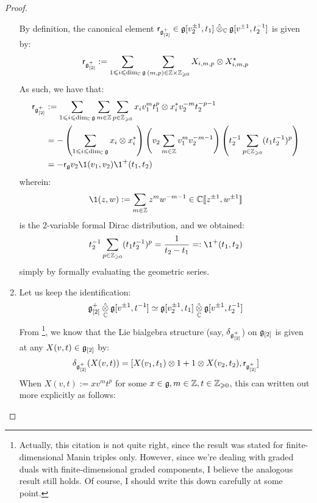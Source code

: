 \begin{proof}
\begin{enumerate}
                    By definition, the canonical element $\sfr_{\g_{[2]}^+} \in \g[v_2^{\pm 1}, t_1] \hattensor_{\bbC} \g[v^{\pm 1}, t_2^{-1}]$ is given by:
                        $$\sfr_{\g_{[2]}^+} := \sum_{1 \leq i \leq \dim_{\bbC} \g} \sum_{(m, p) \in \Z \x \Z_{\geq 0}} X_{i, m, p} \tensor X_{i, m, p}^{\star}$$
                    As such, we have that:
                        $$
                            \begin{aligned}
                                \sfr_{\g_{[2]}^+} & := \sum_{1 \leq i \leq \dim_{\bbC} \g} \sum_{m \in \Z} \sum_{p \in \Z_{\geq 0}} x_i v_1^m t_1^p \tensor x_i^* v_2^{-m} t_2^{-p - 1}
                                \\
                                & = -\left( \sum_{1 \leq i \leq \dim_{\bbC} \g} x_i \tensor x_i^* \right) \left( v_2 \sum_{m \in \Z} v_1^m v_2^{-m - 1} \right) \left( t_2^{-1} \sum_{p \in \Z_{\geq 0}} (t_1 t_2^{-1})^p \right)
                                \\
                                & = -\sfr_{\g} v_2 \1(v_1, v_2) \1^+(t_1, t_2)
                            \end{aligned}
                        $$
                    wherein:
                        $$\1(z, w) := \sum_{m \in \Z} z^m w^{-m - 1} \in \bbC[\![z^{\pm 1}, w^{\pm 1}]\!]$$ 
                    is the $2$-variable formal Dirac distribution, and we obtained:
                        $$t_2^{-1} \sum_{p \in \Z_{\geq 0}} (t_1 t_2^{-1})^p = \frac{1}{t_2 - t_1} =: \1^+(t_1, t_2)$$
                    simply by formally evaluating the geometric series. 
                    \item Let us keep the identification:
                        $$\g_{[2]}^+ \hattensor_{\bbC} \g[v^{\pm 1}, t^{-1}] \cong \g[v_2^{\pm 1}, t_1] \hattensor_{\bbC} \g[v^{\pm 1}, t_2^{-1}]$$
                    From \cite[pp. 5]{etingof_kazhdan_quantisation_1}\footnote{Actually, this citation is not quite right, since the result was stated for finite-dimensional Manin triples only. However, since we're dealing with graded duals with finite-dimensional graded components, I believe the analogous result still holds. Of course, I should write this down carefully at some point.}, we know that the Lie bialgebra structure (say, $\delta_{\mathfrak{g}_{[2]}^+}$) on $\mathfrak{g}_{[2]}$ is given at any $X(v, t) \in \mathfrak{g}_{[2]}$ by:
                        $$\delta_{\g_{[2]}^+}( X(v, t) ) = [X(v_1, t_1) \tensor 1 + 1 \tensor X(v_2, t_2), \sfr_{\g_{[2]}^+}]$$
                    When $X(v, t) := x v^m t^p$ for some $x \in \mathfrak{g}, m \in \mathbb{Z}, t \in \mathbb{Z}_{\geqslant 0}$, this can written out more explicitly as follows:

\end{enumerate}
\end{proof}
